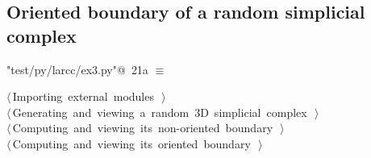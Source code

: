 \documentclass[11pt,oneside]{article}	%
\begin{document}
\subsection{Oriented boundary of a random simplicial complex}


\begin{flushleft} \small
\begin{minipage}{\linewidth} \label{scrap46}
\protect{}\verb@"test/py/larcc/ex3.py"@\nobreak\ {\footnotesize 21a }$\equiv$
\vspace{-1ex}
\begin{list}{}{} \item
\mbox{}\verb@@\hbox{$\langle\,$Importing external modules\nobreak\ {\footnotesize {}}$\,\rangle$}\verb@@\\
\mbox{}\verb@@\hbox{$\langle\,$Generating and viewing a random 3D simplicial complex\nobreak\ {\footnotesize {}}$\,\rangle$}\verb@@\\
\mbox{}\verb@@\hbox{$\langle\,$Computing and viewing its non-oriented boundary\nobreak\ {\footnotesize {}}$\,\rangle$}\verb@@\\
\mbox{}\verb@@\hbox{$\langle\,$Computing and viewing its oriented boundary\nobreak\ {\footnotesize {}}$\,\rangle$}\verb@@\\
\mbox{}\verb@@{\NWsep}
\end{list}
\vspace{-2ex}
\end{minipage}\\[4ex]
\end{flushleft}
\end{document}
